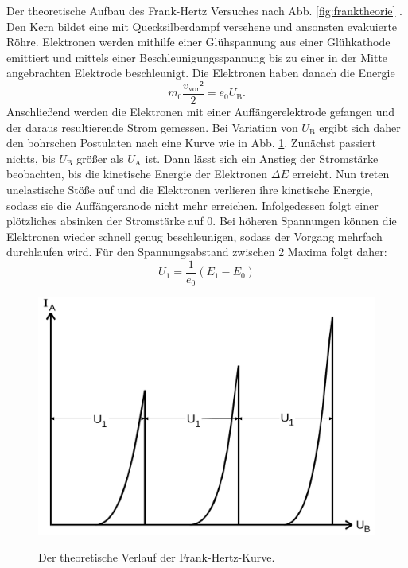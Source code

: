 Der theoretische Aufbau des Frank-Hertz Versuches nach Abb.
\ref{fig:franktheorie} . Den Kern bildet eine mit Quecksilberdampf versehene und ansonsten evakuierte
Röhre. Elektronen werden mithilfe einer Glühspannung aus einer Glühkathode emittiert
und mittels einer Beschleunigungsspannung bis zu einer in der Mitte angebrachten
Elektrode beschleunigt. Die Elektronen haben danach die Energie
\begin{equation}
  m_0 \frac{v_\text{vor}²}{2} = e_0 U_\text{B}\text{.}\label{eq:ekin}
  \end{equation}
   Anschließend werden die Elektronen mit einer Auffängerelektrode
gefangen und der daraus resultierende Strom gemessen.
Bei Variation von $U_\text{B}$ ergibt sich daher den bohrschen Postulaten nach eine
 Kurve wie in Abb. \ref{fig:Graphtheorie}. Zunächst passiert nichts, bis $U_\text{B}$ größer als $U_\text{A}$ ist.
 Dann lässt sich ein Anstieg der Stromstärke beobachten, bis die kinetische Energie
 der Elektronen $\Delta E$ erreicht. Nun treten unelastische Stöße auf und die Elektronen
 verlieren ihre kinetische Energie, sodass sie die Auffängeranode nicht mehr erreichen.
 Infolgedessen folgt einer plötzliches absinken der Stromstärke auf 0.  Bei höheren
 Spannungen können die Elektronen wieder schnell genug beschleunigen, sodass der
 Vorgang mehrfach durchlaufen wird. Für den Spannungsabstand zwischen 2 Maxima folgt daher:
 \begin{equation}
   U_1 = \frac{1}{e_0}\left( E_1 - E_0 \right)\label{eq:udiff}
   \end{equation}


   \begin{figure}
   	\centering
   	\caption{Der theoretische Verlauf der Frank-Hertz-Kurve.}
   	\includegraphics[width=\linewidth-170pt,height=\textheight-170pt,keepaspectratio]{content/theorie.png}
   	\label{fig:Graphtheorie}
   \end{figure}



